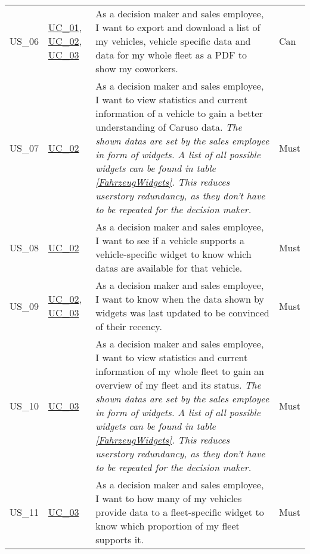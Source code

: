 \begin{footnotesize}
\begin{longtable}[L L L L]{ p{} p{} p{} p{}}
      \hypertarget{Ref:US6}{US\_06} & \hyperlink{Ref:UC1}{UC\_01}, \newline \hyperlink{Ref:UC2}{UC\_02}, \newline \hyperlink{Ref:UC3}{UC\_03} & As a decision maker and sales employee, I want to export and download a list of my vehicles, vehicle specific data and data for my whole fleet as a PDF to show my coworkers. & Can \\

      \hypertarget{Ref:US7}{US\_07} & \hyperlink{Ref:UC2}{UC\_02} & As a decision maker and sales employee, I want to view statistics and current information of a vehicle to gain a better understanding of Caruso data. 
      \newline
      \emph{The shown \glspl{data} are set by the sales employee in form of \glspl{widget}. A list of all possible \glspl{widget} can be found in table \ref{FahrzeugWidgets}. This reduces \gls{userstory} redundancy, as they don't have to be repeated for the decision maker.} & Must \\

      \hypertarget{Ref:US8}{US\_08} & \hyperlink{Ref:UC2}{UC\_02} & As a decision maker and sales employee, I want to see if a vehicle supports a vehicle-specific \gls{widget} to know which \glspl{data} are available for that vehicle. & Must
      \\

      \hypertarget{Ref:US9}{US\_09} & \hyperlink{Ref:UC2}{UC\_02}, \newline \hyperlink{Ref:UC3}{UC\_03} & As a decision maker and sales employee, I want to know when the data shown by \glspl{widget} was last updated to be convinced of their recency. & Must
      \\

      \hypertarget{Ref:US10}{US\_10} & \hyperlink{Ref:UC3}{UC\_03} & As a decision maker and sales employee, I want to view statistics and current information of my whole fleet to gain an overview of my fleet and its status.
      \newline
      \emph{The shown \glspl{data} are set by the sales employee in form of \glspl{widget}. A list of all possible \glspl{widget} can be found in table \ref{FahrzeugWidgets}. This reduces \gls{userstory} redundancy, as they don't have to be repeated for the decision maker.} & Must \\

      \hypertarget{Ref:US11}{US\_11} & \hyperlink{Ref:UC3}{UC\_03} & As a decision maker and sales employee, I want to how many of my vehicles provide data to a fleet-specific \gls{widget} to know which proportion of my fleet supports it. & Must \\


\end{longtable}
\end{footnotesize}
